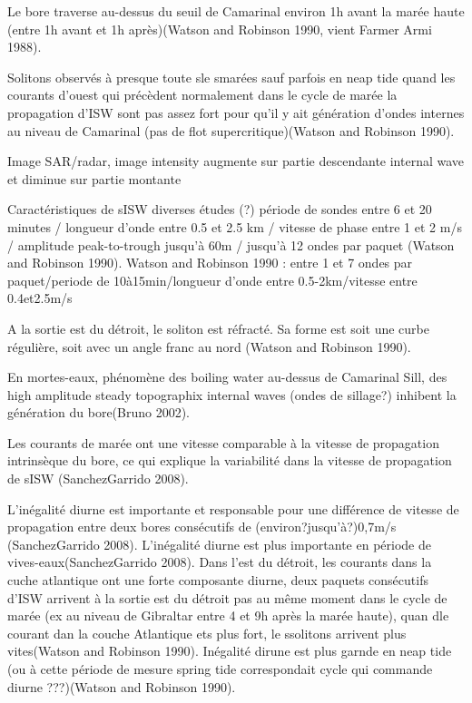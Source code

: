 Le bore traverse au-dessus du seuil de Camarinal environ 1h avant la marée haute (entre 1h avant et 1h après)(Watson and Robinson 1990, vient Farmer Armi 1988).

Solitons observés à presque toute sle smarées sauf parfois en neap tide quand les courants d’ouest qui précèdent normalement dans le cycle de marée la propagation d’ISW sont pas assez fort pour qu’il y ait génération d’ondes internes au niveau de Camarinal (pas de flot supercritique)(Watson and Robinson 1990).

Image SAR/radar, image intensity augmente sur partie descendante internal wave et diminue sur partie montante

Caractéristiques de sISW diverses études (?) période de sondes entre 6 et 20 minutes / longueur d'onde entre 0.5 et 2.5 km / vitesse de phase entre 1 et 2 m/s / amplitude peak-to-trough jusqu'à 60m / jusqu'à 12 ondes par paquet (Watson and Robinson 1990). Watson and Robinson 1990 : entre 1 et 7 ondes par paquet/periode de 10à15min/longueur d'onde entre 0.5-2km/vitesse entre 0.4et2.5m/s

A la sortie est du détroit, le soliton est réfracté. Sa forme est soit une curbe régulière, soit avec un angle franc au nord (Watson and Robinson 1990).

En mortes-eaux, phénomène des boiling water au-dessus de Camarinal Sill, des high amplitude steady topographix internal waves (ondes de sillage?) inhibent la génération du bore(Bruno 2002).

Les courants de marée ont une vitesse comparable à la vitesse de propagation intrinsèque du bore, ce qui explique la variabilité dans la vitesse de propagation de sISW (SanchezGarrido 2008).

L’inégalité diurne est importante et responsable pour une différence de vitesse de propagation entre deux bores consécutifs de (environ?jusqu’à?)0,7m/s (SanchezGarrido 2008). L’inégalité diurne est plus importante en période de vives-eaux(SanchezGarrido 2008). Dans l’est du détroit, les courants dans la cuche atlantique ont une forte composante diurne, deux paquets consécutifs d’ISW arrivent à la sortie est du détroit pas au même moment dans le cycle de marée (ex au niveau de Gibraltar entre 4 et 9h après la marée haute), quan dle courant dan la couche Atlantique ets plus fort, le ssolitons arrivent plus vites(Watson and Robinson 1990). Inégalité dirune est plus garnde en neap tide (ou à cette période de mesure spring tide correspondait cycle qui commande diurne ???)(Watson and Robinson 1990).

